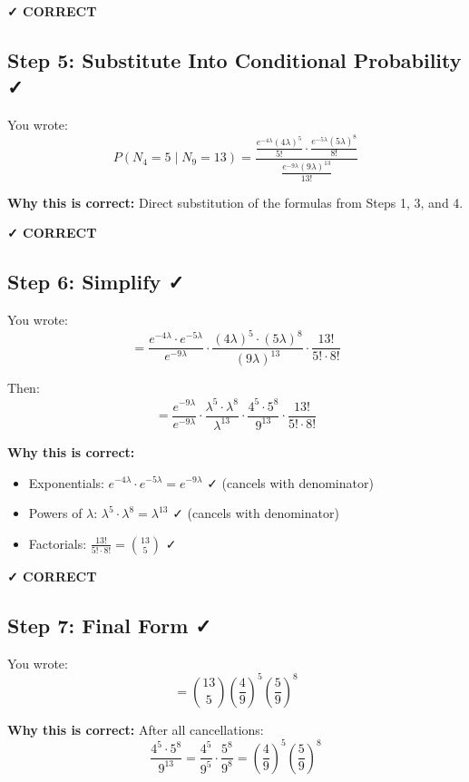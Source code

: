 \documentclass[11pt]{article}
\begin{document}
\textcolor{green!60!black}{\textbf{✓ CORRECT}}

\subsection{Step 5: Substitute Into Conditional Probability ✓}

You wrote:
\[
P(N_4 = 5 \mid N_9 = 13) = \frac{\frac{e^{-4\lambda}(4\lambda)^5}{5!} \cdot \frac{e^{-5\lambda}(5\lambda)^8}{8!}}{\frac{e^{-9\lambda}(9\lambda)^{13}}{13!}}
\]

\textbf{Why this is correct:} Direct substitution of the formulas from Steps 1, 3, and 4.

\textcolor{green!60!black}{\textbf{✓ CORRECT}}

\subsection{Step 6: Simplify ✓}

You wrote:
\[
= \frac{e^{-4\lambda} \cdot e^{-5\lambda}}{e^{-9\lambda}} \cdot \frac{(4\lambda)^5 \cdot (5\lambda)^8}{(9\lambda)^{13}} \cdot \frac{13!}{5! \cdot 8!}
\]

Then:
\[
= \frac{e^{-9\lambda}}{e^{-9\lambda}} \cdot \frac{\lambda^5 \cdot \lambda^8}{\lambda^{13}} \cdot \frac{4^5 \cdot 5^8}{9^{13}} \cdot \frac{13!}{5! \cdot 8!}
\]

\textbf{Why this is correct:}
\begin{itemize}
    \item Exponentials: $e^{-4\lambda} \cdot e^{-5\lambda} = e^{-9\lambda}$ ✓ (cancels with denominator)
    \item Powers of $\lambda$: $\lambda^5 \cdot \lambda^8 = \lambda^{13}$ ✓ (cancels with denominator)
    \item Factorials: $\frac{13!}{5! \cdot 8!} = \binom{13}{5}$ ✓
\end{itemize}

\textcolor{green!60!black}{\textbf{✓ CORRECT}}

\subsection{Step 7: Final Form ✓}

You wrote:
\[
= \binom{13}{5} \left(\frac{4}{9}\right)^5 \left(\frac{5}{9}\right)^8
\]

\textbf{Why this is correct:} After all cancellations:
\[
\frac{4^5 \cdot 5^8}{9^{13}} = \frac{4^5}{9^5} \cdot \frac{5^8}{9^8} = \left(\frac{4}{9}\right)^5 \left(\frac{5}{9}\right)^8
\]
\end{document}
